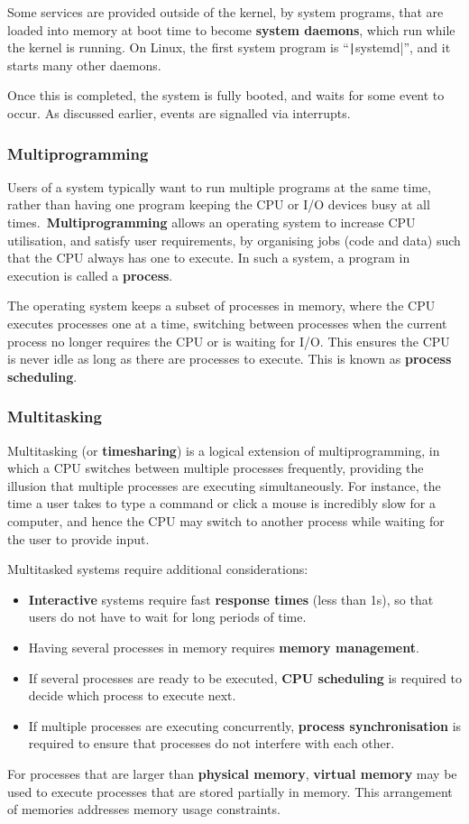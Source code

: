 \documentclass{article}
\begin{document}
Some services are provided outside of the kernel, by system programs,
that are loaded into memory at boot time to become \textbf{system
daemons}, which run while the kernel is running. On Linux, the first
system program is ``\texttt|systemd|'', and it starts many
other daemons.

Once this is completed, the system is fully booted, and waits for some
event to occur. As discussed earlier, events are signalled via
interrupts.
\subsubsection{Multiprogramming}
Users of a system typically want to run multiple programs at the same
time, rather than having one program keeping the CPU or I/O devices
busy at all times.\ \textbf{Multiprogramming} allows an operating
system to increase CPU utilisation, and satisfy user requirements, by
organising jobs (code and data) such that the CPU always has one to
execute. In such a system, a program in execution is called a
\textbf{process}.

The operating system keeps a subset of processes in memory, where the
CPU executes processes one at a time, switching between processes when
the current process no longer requires the CPU or is waiting for I/O.
This ensures the CPU is never idle as long as there are processes to
execute. This is known as \textbf{process scheduling}.
\subsubsection{Multitasking}
Multitasking (or \textbf{timesharing}) is a logical extension of
multiprogramming, in which a CPU switches between multiple processes
frequently, providing the illusion that multiple processes are
executing simultaneously. For instance, the time a user takes to type a
command or click a mouse is incredibly slow for a computer, and hence
the CPU may switch to another process while waiting for the user to
provide input.

Multitasked systems require additional considerations:
\begin{itemize}
    \item \textbf{Interactive} systems require fast
          \textbf{response times} (less than 1s), so that
          users do not have to wait for long periods of time.
    \item Having several processes in memory requires \textbf{memory
          management}.
    \item If several processes are ready to be executed, \textbf{CPU
          scheduling} is required to decide which process to execute
          next.
    \item If multiple processes are executing concurrently,
          \textbf{process synchronisation} is required to ensure that
          processes do not interfere with each other.
\end{itemize}
For processes that are larger than \textbf{physical memory},
\textbf{virtual memory} may be used to execute processes that are
stored partially in memory.
This arrangement of memories addresses memory usage constraints.
\end{document}
